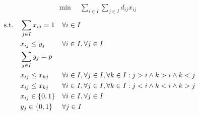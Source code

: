 \begin{align}
    \min\quad \sum_{i \in I} \sum_{j \in I} d_{ij} x_{ij} & \label{obj}
\end{align}
\vspace*{-6mm}
\begin{align}
    \text{s.t.\quad} & \sum_{j \in I} x_{ij} = 1 & & \forall i \in I \label{assign} \\
                & x_{ij} \leq y_j & & \forall i \in I, \forall j \in I \label{open} \\
                & \sum_{j \in I} y_j = p & & \label{choosep}\\
                & x_{ij} \leq x_{kj} & & \forall i \in I, \forall j \in I, \forall k \in I: j > i \wedge k > i \wedge k < j \label{compactF} \\
                & x_{ij} \leq x_{kj} & & \forall i \in I, \forall j \in I, \forall k \in I: j < i \wedge k < i \wedge k > j \label{comactB} \\
                & x_{ij} \in \{0,1\} & & \forall i \in I, \forall j \in I \label{intx}\\
                & y_j \in \{0,1\} & & \forall j \in I \label{inty}
\end{align}
